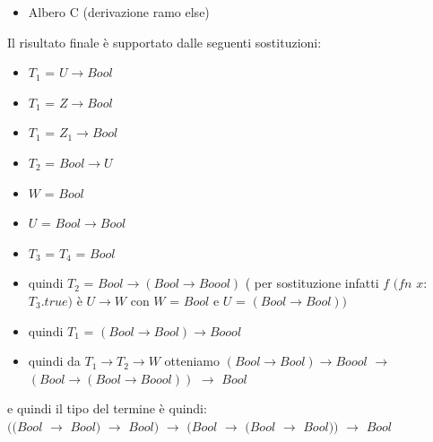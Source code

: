 \begin{enumerate}[label=\textbf{\alph*}), leftmargin=*]
\begin{itemize}[label=$\star$]
		
		
		\item 	Albero C (derivazione ramo else)\\
		
		\vspace{1cm}					
		
		
		\end{itemize}				
		
		Il risultato finale \`e supportato dalle seguenti sostituzioni:
		\begin{itemize}
		
		\item $T_1$ = $U \rightarrow Bool$
		\item $T_1$ = $Z \rightarrow Bool$
		\item $T_1$ = $Z_1 \rightarrow Bool$
		\item $T_2$ = $Bool \rightarrow U$
		\item $W$ = $Bool$
		\item $U$ = $Bool \rightarrow Bool$
		\item $T_3$ = $T_4$ = $Bool$
		
		\item quindi $T_2$ = $Bool \rightarrow (Bool \rightarrow Boool)$ ( per sostituzione infatti $f$ $(fn$ $x$:$T_3.true)$ \`e $U \rightarrow W$ con $W$ = $Bool$ e $U$ = $(Bool \rightarrow Bool))$
		\item quindi $T_1$ =  $(Bool \rightarrow Bool) \rightarrow Boool$
		\item quindi da $T_1 \rightarrow T_2 \rightarrow W$ otteniamo $(Bool \rightarrow Bool) \rightarrow Boool$ $\rightarrow$ $(Bool \rightarrow (Bool \rightarrow Boool))$ $\rightarrow$ $Bool$
		
		
		
		\end{itemize}
		e quindi il tipo del termine \`e quindi:\\
		$((Bool$ $\rightarrow$ $Bool)$ $\rightarrow$ $Bool)$ $\rightarrow$ $(Bool$ $\rightarrow$ $(Bool$ $\rightarrow$ $Bool))$ $\rightarrow$ $Bool$ 
		

\end{enumerate}
